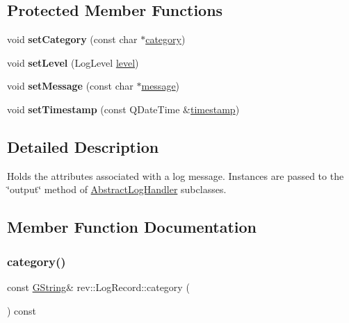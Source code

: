 \subsection*{Protected Member Functions}
\begin{DoxyCompactItemize}
\item 
\mbox{\label{classrev_1_1_log_record_a4a4c24e4b441153355641a238424443e}} 
void {\bfseries set\+Category} (const char $\ast$\mbox{\hyperlink{classrev_1_1_log_record_a1d6b202d4a6b5706cbfd4a042b4b7978}{category}})
\item 
\mbox{\label{classrev_1_1_log_record_a8c3e1c655ad19a64b6fc1552b950ad2a}} 
void {\bfseries set\+Level} (Log\+Level \mbox{\hyperlink{classrev_1_1_log_record_aee511a5db62b6e1bf0c521de615230cf}{level}})
\item 
\mbox{\label{classrev_1_1_log_record_ae28d794b7ea783d0ba1eb3de4ed0873f}} 
void {\bfseries set\+Message} (const char $\ast$\mbox{\hyperlink{classrev_1_1_log_record_aa1b89cffc639d7b1b87ac5ca6e787491}{message}})
\item 
\mbox{\label{classrev_1_1_log_record_af98d089569784e042a86f624b87d7495}} 
void {\bfseries set\+Timestamp} (const Q\+Date\+Time \&\mbox{\hyperlink{classrev_1_1_log_record_ad6020410e8e1eea719c3885b6621de5b}{timestamp}})
\end{DoxyCompactItemize}


\subsection{Detailed Description}
Holds the attributes associated with a log message. Instances are passed to the \char`\"{}output\char`\"{} method of \mbox{\hyperlink{classrev_1_1_abstract_log_handler}{Abstract\+Log\+Handler}} subclasses. 

\subsection{Member Function Documentation}
\mbox{\label{classrev_1_1_log_record_a1d6b202d4a6b5706cbfd4a042b4b7978}} 
\subsubsection{\texorpdfstring{category()}{category()}}
{\footnotesize\ttfamily const \mbox{\hyperlink{classrev_1_1_g_string}{G\+String}}\& rev\+::\+Log\+Record\+::category (\begin{DoxyParamCaption}{ }\end{DoxyParamCaption}) const\hspace{0.3cm}{\ttfamily [inline]}}




